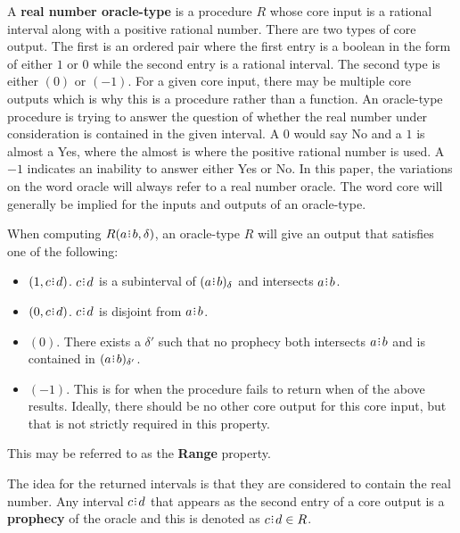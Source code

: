 \documentclass[12pt]{article}
\begin{document}
A \textbf{real number oracle-type} is a procedure $R$ whose core input is a rational interval along with a positive rational number. There are two types of core output. The first is an ordered pair where the first entry is a boolean in the form of either $1$ or $0$ while the second entry is a rational interval. The second type is either $(0)$ or $(-1)$. For a given core input, there may be multiple core outputs which is why this is a procedure rather than a function. An oracle-type procedure is trying to answer the question of whether the real number under consideration is contained in the given interval. A $0$ would say No and a $1$ is almost a Yes, where the almost is where the positive rational number is used. A $-1$ indicates an inability to answer either Yes or No. In this paper, the variations on the word oracle will always refer to a real number oracle. The word core will generally be implied for the inputs and outputs of an oracle-type.

When computing $R(a\rint b, \delta)$, an oracle-type $R$ will give an output that satisfies one of the following: 
\begin{itemize}
        \item $(1, c\rint d)$. $c\rint d$ is a subinterval of $\halo{a\rint b}$ and intersects $a\rint b$. 
        \item $(0, c\rint d)$. $c \rint d$ is disjoint from $a\rint b$.
        \item $(0)$.  There exists a $\delta'$ such that no prophecy both intersects $a \rint b$ and is contained in $\halo[\delta']{a \rint b}$. 
        \item $(-1)$. This is for when the procedure fails to return when of the above results. Ideally, there should be no other core output for this core input, but that is not strictly required in this property. 
\end{itemize} 
This may be referred to as the \textbf{Range} property. 

The idea for the returned intervals is that they are considered to contain the real number. Any interval $c\rint d$ that appears as the second entry of a core output is a \textbf{prophecy} of the oracle and this is denoted as $c\rint d \in R$. 
\end{document}
